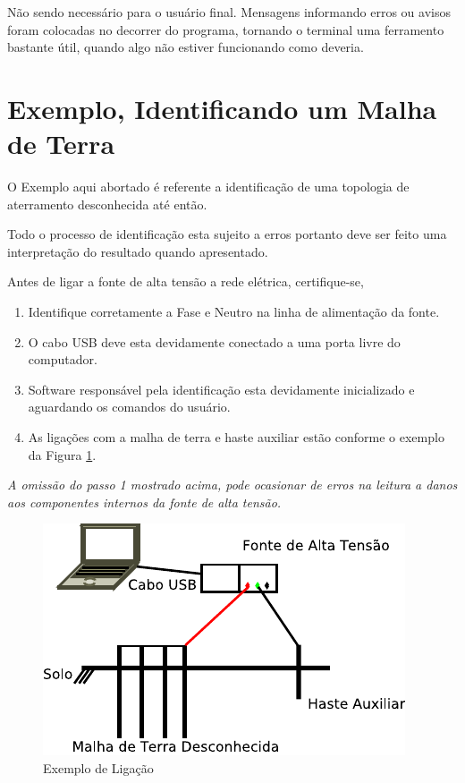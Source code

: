 \documentclass[a4paper, 10pt]{article}
\begin{document}
Não sendo necessário para o usuário final. Mensagens informando erros ou avisos
foram colocadas no decorrer do programa, tornando o terminal uma ferramento bastante útil, 
quando algo não estiver funcionando como deveria.

\section{Exemplo, Identificando um Malha de Terra}

O Exemplo aqui abortado é referente a identificação de uma topologia de aterramento
desconhecida até então.

Todo o processo de identificação esta sujeito a erros portanto deve ser feito uma 
interpretação do resultado quando apresentado.

Antes de ligar a fonte de alta tensão a rede elétrica, certifique-se,

\begin{enumerate}
    \item Identifique corretamente a Fase e Neutro na linha de alimentação da fonte.
    \item O cabo USB deve esta devidamente conectado a uma porta livre do computador.
    \item Software responsável pela identificação esta devidamente inicializado e aguardando
        os comandos do usuário.
    \item As ligações com a malha de terra e haste auxiliar estão conforme o exemplo da Figura \ref{fig_ligacao_hastes}.

\end{enumerate}

\textit{A omissão do passo 1 mostrado acima, pode ocasionar de erros na leitura a 
danos aos componentes internos da fonte de alta tensão.}

\begin{figure}[H]
        \caption{\label{fig_ligacao_hastes}Exemplo de Ligação}
	    \begin{center}
            \includegraphics[scale=1.2]{../fotos/conexoes/hastes.pdf}
	    \end{center}
\end{figure}
\end{document}
